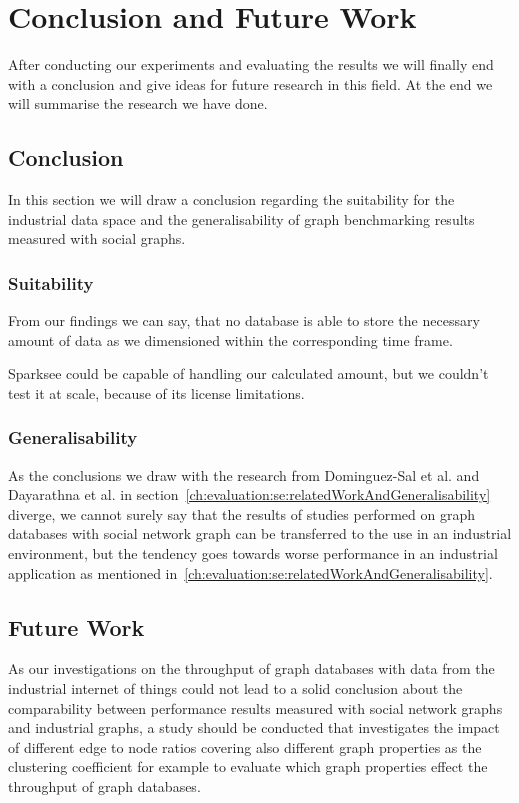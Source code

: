 \chapter{Conclusion and Future Work}
\label{ch:futureWork}
After conducting our experiments and evaluating the results we will finally end with a conclusion and give ideas for future research in this field.
At the end we will summarise the research we have done.

\section{Conclusion}
\label{ch:futureWork:se:conclusion}
In this section we will draw a conclusion regarding the suitability for the industrial data space and the generalisability of graph benchmarking results measured with social graphs.

\subsection{Suitability}
From our findings we can say,
that no database is able to store the necessary amount of data as we dimensioned within the corresponding time frame.

Sparksee could be capable of handling our calculated amount,
but we couldn't test it at scale,
because of its license limitations.

\subsection{Generalisability}
As the conclusions we draw with the research from Dominguez-Sal et al.\cite{TaoShen} and Dayarathna et al.\cite{Dayarathna2012} in section~\ref{ch:evaluation:se:relatedWorkAndGeneralisability} diverge,
we cannot surely say that the results of studies performed on graph databases with social network graph can be transferred to the use in an industrial environment,
but the tendency goes towards worse performance in an industrial application as mentioned in~\ref{ch:evaluation:se:relatedWorkAndGeneralisability}.

\section{Future Work}
As our investigations on the throughput of graph databases with data from the industrial internet of things could not lead to a solid conclusion about the comparability between performance results measured with social network graphs and industrial graphs,
a study should be conducted that investigates the impact of different edge to node ratios covering also different graph properties as the clustering coefficient for example to evaluate which graph properties effect the throughput of graph databases.

